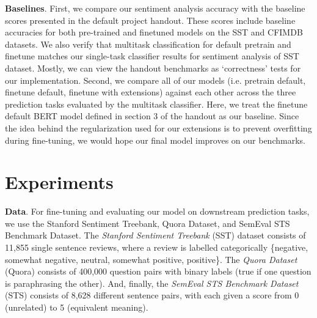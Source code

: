 \documentclass{article}
\begin{document}

\textbf{Baselines}. First, we compare our sentiment analysis accuracy with the baseline scores presented in the default project handout. These scores include baseline accuracies for both pre-trained and finetuned models on the SST and CFIMDB datasets. We also verify that multitask classification for default pretrain and finetune matches our single-task classifier results for sentiment analysis of SST dataset. Mostly, we can view the handout benchmarks as `correctness' tests for our implementation. Second, we compare all of our models (i.e. pretrain default, finetune default, finetune with extensions) against each other across the three prediction tasks evaluated by the multitask classifier. Here, we treat the finetune default BERT model defined in section 3 of the handout as our baseline. Since the idea behind the regularization used for our extensions is to prevent overfitting during fine-tuning, we would hope our final model improves on our benchmarks. 



\section{Experiments}

\textbf{Data}. For fine-tuning and evaluating our model on downstream prediction tasks, we use the Stanford Sentiment Treebank, Quora Dataset, and SemEval STS Benchmark Dataset. The \emph{Stanford Sentiment Treebank} (SST) dataset consists of 11,855 single sentence reviews, where a review is labelled categorically \{negative, somewhat negative, neutral, somewhat positive, positive\}. The \emph{Quora Dataset} (Quora) consists of 400,000 question pairs with binary labels (true if one question is paraphrasing the other). And, finally, the \emph{SemEval STS Benchmark Dataset} (STS) consists of 8,628 different sentence pairs, with each given a score from 0 (unrelated) to 5 (equivalent meaning). 
\end{document}
